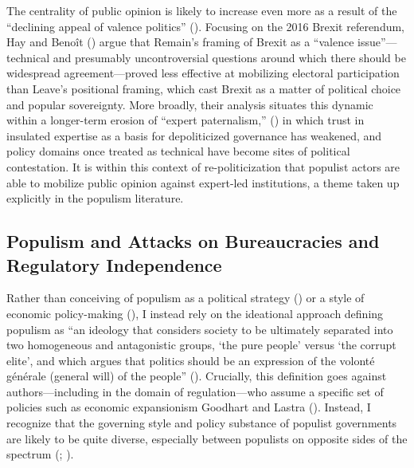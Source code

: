 \documentclass[
  11pt,
  letterpaper,
  DIV=11,
  numbers=noendperiod]{scrartcl}
\begin{document}
The centrality of public opinion is likely to increase even more as a
result of the ``declining appeal of valence politics''
(). Focusing on the 2016
Brexit referendum, Hay and Benoît () argue
that Remain's framing of Brexit as a ``valence issue''---technical and
presumably uncontroversial questions around which there should be
widespread agreement---proved less effective at mobilizing electoral
participation than Leave's positional framing, which cast Brexit as a
matter of political choice and popular sovereignty. More broadly, their
analysis situates this dynamic within a longer-term erosion of ``expert
paternalism,'' () in which trust in
insulated expertise as a basis for depoliticized governance has
weakened, and policy domains once treated as technical have become sites
of political contestation. It is within this context of
re-politicization that populist actors are able to mobilize public
opinion against expert-led institutions, a theme taken up explicitly in
the populism literature.

\subsection{Populism and Attacks on Bureaucracies and Regulatory
Independence}\label{populism-and-attacks-on-bureaucracies-and-regulatory-independence}

Rather than conceiving of populism as a political strategy
() or a style of economic
policy-making (), I instead rely on
the ideational approach defining populism as ``an ideology that
considers society to be ultimately separated into two homogeneous and
antagonistic groups, `the pure people' versus `the corrupt elite', and
which argues that politics should be an expression of the volonté
générale (general will) of the people'' (). Crucially, this definition goes against authors---including in
the domain of regulation---who assume a specific set of policies such as
economic expansionism Goodhart and Lastra
(). Instead, I recognize that the
governing style and policy substance of populist governments are likely
to be quite diverse, especially between populists on opposite sides of
the spectrum (;
).
\end{document}
